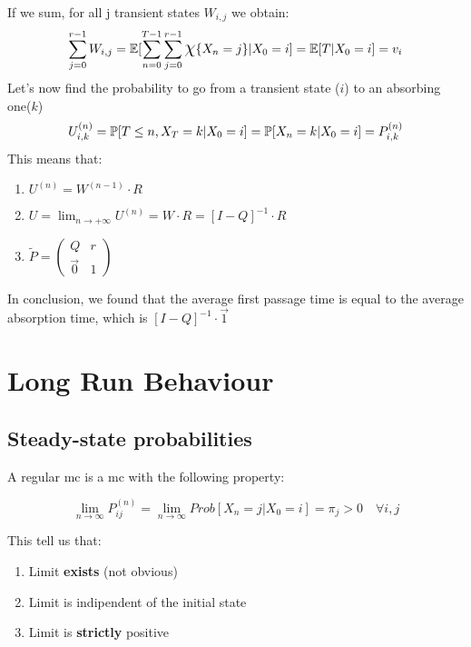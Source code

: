 If we sum, for all j transient states $W_{i,j}$  we obtain:
\begin{equation}
	\sum\limits_{j=0}^{r-1}W_{i,j} = \mathbb{E}[\sum\limits_{n=0}^{T-1}\sum\limits_{j=0}^{r-1}\mbox{\Large $\chi$}\{X_n=j\}|X_0=i] = \mathbb{E}[T|X_0=i]=v_i
\end{equation}
Let's now find the probability to go from a transient state ($i$) to an absorbing one($k$)
\begin{equation}
	U_{i,k}^{(n)} = \mathbb{P}[T \le n , X_T = k | X_0=i] = \mathbb{P}[X_n=k|X_0=i]=P_{i,k}^{(n)}
\end{equation}
This means that:
\begin{enumerate}
	\item $U^{(n)} = W^{(n-1)}\cdot R$
	\item $U=\lim_{n\to +\infty} U^{(n)} = W \cdot R = [I-Q]^{-1}\cdot R$
	\item $\tilde{P}=\begin{pmatrix} Q & r \\ \vec{0}&1 \end{pmatrix}$
\end{enumerate}
In conclusion, we found that the average first passage time is equal to the average
 absorption time, which is $[I-Q]^{-1}\cdot \vec{1}$
\section{Long Run Behaviour}
\subsection{Steady-state probabilities}

	\begin{definition}
		A regular \gls{mc} is a \gls{mc} with the following property:

		\begin{equation} \lim_{n \to \infty} P_{ij}^{(n)} = \lim_{ n \to \infty} Prob[ X_n=j | X_0 =i] = \pi_j > 0 \quad \forall i, j \end{equation}

	\end{definition}

	This tell us that:
	\begin{enumerate}
		\item Limit \textbf{exists} (not obvious)
		\item Limit is indipendent of the initial state
		\item Limit is \textbf{strictly} positive
	\end{enumerate}


